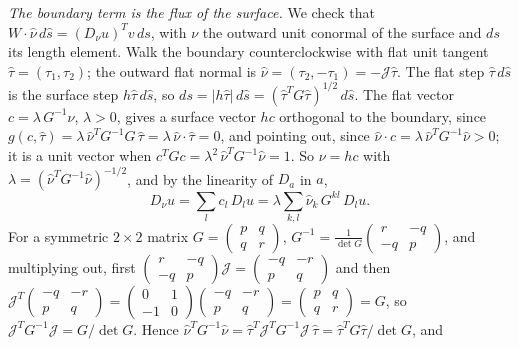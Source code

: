 \emph{The boundary term is the flux of the surface.} We check that $W\cdot\hat\nu\, d\hat s = (D_\nu u)^Tv\, ds$, with $\nu$ the outward unit conormal of the surface and $ds$ its length element. Walk the boundary counterclockwise with flat unit tangent $\hat\tau = (\tau_1, \tau_2)$; the outward flat normal is $\hat\nu = (\tau_2, -\tau_1) = -\mathcal J\hat\tau$. The flat step $\hat\tau\, d\hat s$ is the surface step $h\hat\tau\, d\hat s$, so $ds = |h\hat\tau|\, d\hat s = (\hat\tau^T G\hat\tau)^{1/2}\, d\hat s$. The flat vector $c = \lambda\, G^{-1}\hat\nu$, $\lambda > 0$, gives a surface vector $hc$ orthogonal to the boundary, since $g(c, \hat\tau) = \lambda\,\hat\nu^T G^{-1} G\,\hat\tau = \lambda\,\hat\nu\cdot\hat\tau = 0$, and pointing out, since $\hat\nu\cdot c = \lambda\,\hat\nu^TG^{-1}\hat\nu > 0$; it is a unit vector when $c^TGc = \lambda^2\,\hat\nu^TG^{-1}\hat\nu = 1$. So $\nu = hc$ with $\lambda = (\hat\nu^TG^{-1}\hat\nu)^{-1/2}$, and by the linearity of $D_a$ in $a$,
\begin{equation*}
D_\nu u = \sum_l c_l\, D_lu = \lambda\sum_{k,l} \hat\nu_k\, G^{kl}\, D_lu .
\end{equation*}
For a symmetric $2\times 2$ matrix $G = \left(\begin{smallmatrix} p & q \\ q & r\end{smallmatrix}\right)$, $G^{-1} = \frac{1}{\det G}\left(\begin{smallmatrix} r & -q \\ -q & p\end{smallmatrix}\right)$, and multiplying out, first $\left(\begin{smallmatrix} r & -q \\ -q & p\end{smallmatrix}\right)\mathcal J = \left(\begin{smallmatrix} -q & -r \\ p & q\end{smallmatrix}\right)$ and then $\mathcal J^T\left(\begin{smallmatrix} -q & -r \\ p & q\end{smallmatrix}\right) = \left(\begin{smallmatrix} 0 & 1 \\ -1 & 0\end{smallmatrix}\right)\left(\begin{smallmatrix} -q & -r \\ p & q\end{smallmatrix}\right) = \left(\begin{smallmatrix} p & q \\ q & r\end{smallmatrix}\right) = G$, so $\mathcal J^TG^{-1}\mathcal J = G/\det G$. Hence $\hat\nu^TG^{-1}\hat\nu = \hat\tau^T\mathcal J^TG^{-1}\mathcal J\,\hat\tau = \hat\tau^TG\hat\tau/\det G$, and
